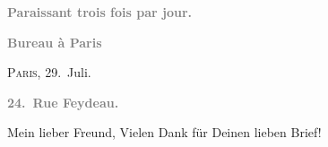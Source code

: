 \pstart
           \begin{otherlanguage}{french}\textcolor{gray}{\textbf{\textbf{Paraissant trois fois par jour.}}}\end{otherlanguage}\pend
           
\pstart
           \begin{otherlanguage}{french}\textcolor{gray}{\textbf{\textbf{Bureau à Paris}}}\end{otherlanguage}\hfill \textsc{Paris}, 29. Juli.\pend
           
\pstart
           \begin{otherlanguage}{french}\textcolor{gray}{\textbf{\textbf{24. Rue Feydeau.}}}\end{otherlanguage}\pend
           
\pstart\center{}Mein lieber Freund,\pend\vspace{0.5em}
\pstart
           Vielen Dank für Deinen lieben Brief!\pend
           
